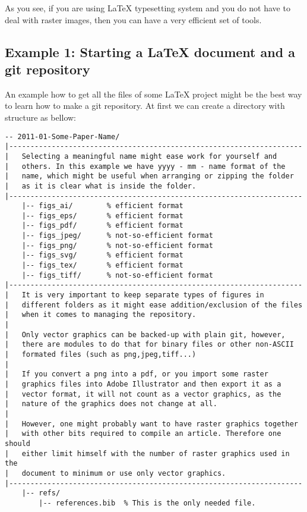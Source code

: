 \documentclass[
]{scrartcl}
\begin{document}
%
As you see, if you are using \LaTeX{} typesetting system and you do not have to
    deal with raster images, then you can have a very efficient set of tools.

%
\subsection{Example 1: Starting a \LaTeX{} document and a git repository}

%
An example how to get all the files of some LaTeX project might be the best
    way to learn how to make a git repository.
%
At first we can create a directory with structure as bellow:
%
\begin{lstlisting}
-- 2011-01-Some-Paper-Name/
|---------------------------------------------------------------------
|   Selecting a meaningful name might ease work for yourself and
|   others. In this example we have yyyy - mm - name format of the
|   name, which might be useful when arranging or zipping the folder
|   as it is clear what is inside the folder.
|---------------------------------------------------------------------
    |-- figs_ai/        % efficient format
    |-- figs_eps/       % efficient format
    |-- figs_pdf/       % efficient format
    |-- figs_jpeg/      % not-so-efficient format
    |-- figs_png/       % not-so-efficient format
    |-- figs_svg/       % efficient format
    |-- figs_tex/       % efficient format
    |-- figs_tiff/      % not-so-efficient format
|---------------------------------------------------------------------
|   It is very important to keep separate types of figures in
|   different folders as it might ease addition/exclusion of the files
|   when it comes to managing the repository.
|
|   Only vector graphics can be backed-up with plain git, however,
|   there are modules to do that for binary files or other non-ASCII
|   formated files (such as png,jpeg,tiff...)
|
|   If you convert a png into a pdf, or you import some raster
|   graphics files into Adobe Illustrator and then export it as a
|   vector format, it will not count as a vector graphics, as the
|   nature of the graphics does not change at all.
|
|   However, one might probably want to have raster graphics together
|   with other bits required to compile an article. Therefore one should
|   either limit himself with the number of raster graphics used in the
|   document to minimum or use only vector graphics.
|---------------------------------------------------------------------
    |-- refs/
        |-- references.bib  % This is the only needed file.

\end{lstlisting}
\end{document}
